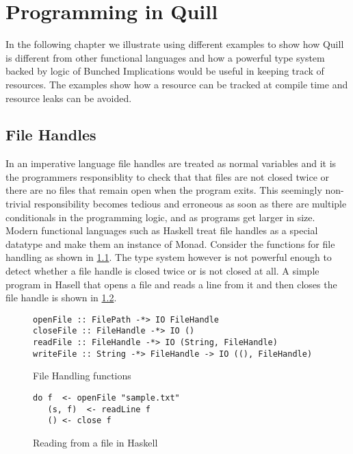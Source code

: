 \chapter{Programming in Quill}
In the following chapter we illustrate using different examples to show how Quill is different
from other functional languages and how a powerful type system backed by logic of Bunched Implications
would be useful in keeping track of resources. The examples show how a resource can be tracked at compile
time and resource leaks can be avoided.

\section{File Handles}\label{sec:file-handle-example}
In an imperative language file handles are treated as normal variables
and it is the programmers responsiblity to check that that files are not closed twice
or there are no files that remain open when the program exits. This seemingly non-trivial
responsibility becomes tedious and erroneous as soon as there are multiple conditionals in the programming
logic, and as programs get larger in size. Modern functional languages such as Haskell treat file handles as
a special datatype and make them an instance of Monad. Consider the functions for file handling
as shown in \cref{fig:file-handling-function}. The type system however is not powerful enough
to detect whether a file handle is closed twice or is not closed at all. A simple program in Hasell that opens a file and reads
a line from it and then closes the file handle is shown in \cref{fig:file-read-close}.

\begin{figure}[h]
  \begin{framed}
    \begin{verbatim}
openFile :: FilePath -*> IO FileHandle
closeFile :: FileHandle -*> IO ()
readFile :: FileHandle -*> IO (String, FileHandle)
writeFile :: String -*> FileHandle -> IO ((), FileHandle)
    \end{verbatim}
  \end{framed}
  \caption{File Handling functions}
  \label{fig:file-handling-function}
\end{figure}

\begin{figure}[h]
  \begin{framed}
    \begin{verbatim}
do f  <- openFile "sample.txt"
   (s, f)  <- readLine f
   () <- close f
    \end{verbatim}
  \end{framed}
  \caption{Reading from a file in Haskell}
  \label{fig:file-read-close}
\end{figure}

